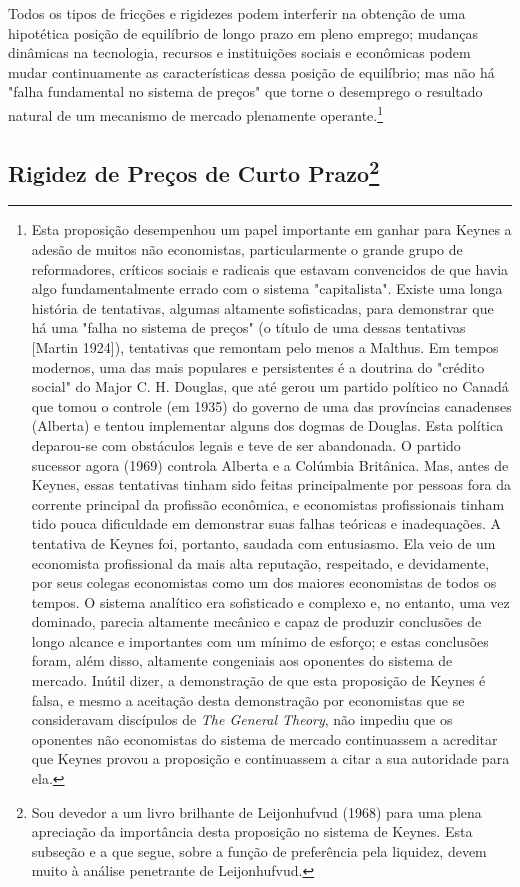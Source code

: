 \documentclass[12pt]{article}
\begin{document}
Todos os tipos de fricções e rigidezes podem interferir na obtenção de uma hipotética posição de equilíbrio de longo prazo em pleno emprego; mudanças dinâmicas na tecnologia, recursos e instituições sociais e econômicas podem mudar continuamente as características dessa posição de equilíbrio; mas não há "falha fundamental no sistema de preços" que torne o desemprego o resultado natural de um mecanismo de mercado plenamente operante.\footnote{Esta proposição desempenhou um papel importante em ganhar para Keynes a adesão de muitos não economistas, particularmente o grande grupo de reformadores, críticos sociais e radicais que estavam convencidos de que havia algo fundamentalmente errado com o sistema "capitalista". Existe uma longa história de tentativas, algumas altamente sofisticadas, para demonstrar que há uma "falha no sistema de preços" (o título de uma dessas tentativas [Martin 1924]), tentativas que remontam pelo menos a Malthus. Em tempos modernos, uma das mais populares e persistentes é a doutrina do "crédito social" do Major C. H. Douglas, que até gerou um partido político no Canadá que tomou o controle (em 1935) do governo de uma das províncias canadenses (Alberta) e tentou implementar alguns dos dogmas de Douglas. Esta política deparou-se com obstáculos legais e teve de ser abandonada. O partido sucessor agora (1969) controla Alberta e a Colúmbia Britânica. Mas, antes de Keynes, essas tentativas tinham sido feitas principalmente por pessoas fora da corrente principal da profissão econômica, e economistas profissionais tinham tido pouca dificuldade em demonstrar suas falhas teóricas e inadequações. A tentativa de Keynes foi, portanto, saudada com entusiasmo. Ela veio de um economista profissional da mais alta reputação, respeitado, e devidamente, por seus colegas economistas como um dos maiores economistas de todos os tempos. O sistema analítico era sofisticado e complexo e, no entanto, uma vez dominado, parecia altamente mecânico e capaz de produzir conclusões de longo alcance e importantes com um mínimo de esforço; e estas conclusões foram, além disso, altamente congeniais aos oponentes do sistema de mercado. Inútil dizer, a demonstração de que esta proposição de Keynes é falsa, e mesmo a aceitação desta demonstração por economistas que se consideravam discípulos de \textit{The General Theory}, não impediu que os oponentes não economistas do sistema de mercado continuassem a acreditar que Keynes provou a proposição e continuassem a citar a sua autoridade para ela.}

\subsection{Rigidez de Preços de Curto Prazo\footnote{Sou devedor a um livro brilhante de Leijonhufvud (1968) para uma plena apreciação da importância desta proposição no sistema de Keynes. Esta subseção e a que segue, sobre a função de preferência pela liquidez, devem muito à análise penetrante de Leijonhufvud.}}
\end{document}
